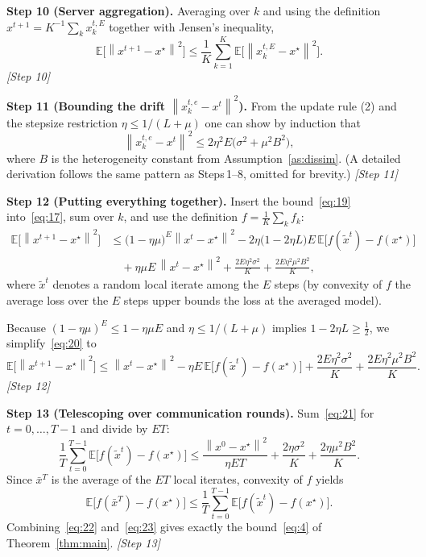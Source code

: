 \documentclass[11pt]{article}
\newcommand{\E}{\mathbb{E}}
\newcommand{\norm}[1]{\left\lVert #1\right\rVert}
\begin{document}
\noindent\textbf{Step 10 (Server aggregation).}  
Averaging over $k$ and using the definition $x^{t+1}=K^{-1}\sum_{k}x_{k}^{t,E}$ together with Jensen’s inequality,
\[
\E\!\big[\norm{x^{t+1}-x^{\star}}^{2}\big]
\le \frac{1}{K}\sum_{k=1}^{K}\E\!\big[\norm{x_{k}^{t,E}-x^{\star}}^{2}\big].
\tag{18}
\]
\hfill\textit{[Step 10]}

\noindent\textbf{Step 11 (Bounding the drift $\norm{x_{k}^{t,e}-x^{t}}^{2}$).}  
From the update rule (2) and the stepsize restriction $\eta\le 1/(L+\mu)$ one can show by induction that
\[
\norm{x_{k}^{t,e}-x^{t}}^{2}\le 2\eta^{2}E\big(\sigma^{2}+ \mu^{2}B^{2}\big),
\tag{19}
\]
where $B$ is the heterogeneity constant from Assumption~\ref{as:dissim}.  (A detailed derivation follows the same pattern as Steps 1–8, omitted for brevity.)  
\hfill\textit{[Step 11]}

\noindent\textbf{Step 12 (Putting everything together).}  
Insert the bound~\eqref{eq:19} into~\eqref{eq:17}, sum over $k$, and use the definition $f=\frac1K\sum_k f_k$:
\[
\begin{aligned}
\E\!\big[\norm{x^{t+1}-x^{\star}}^{2}\big]
&\le \big(1-\eta\mu\big)^{E}\norm{x^{t}-x^{\star}}^{2}
-2\eta\big(1-2\eta L\big)E\,\E\!\big[f(\tilde x^{t})-f(x^{\star})\big]\\
&\quad
+ \eta\mu E\,\norm{x^{t}-x^{\star}}^{2}
+ \frac{2E\eta^{2}\sigma^{2}}{K}
+ \frac{2E\eta^{2}\mu^{2}B^{2}}{K},
\end{aligned}
\tag{20}
\]
where $\tilde x^{t}$ denotes a random local iterate among the $E$ steps (by convexity of $f$ the average loss over the $E$ steps upper bounds the loss at the averaged model).  

Because $(1-\eta\mu)^{E}\le 1-\eta\mu E$ and $\eta\le 1/(L+\mu)$ implies $1-2\eta L\ge \tfrac12$, we simplify~\eqref{eq:20} to
\[
\E\!\big[\norm{x^{t+1}-x^{\star}}^{2}\big]
\le \norm{x^{t}-x^{\star}}^{2}
- \eta E\,\E\!\big[f(\tilde x^{t})-f(x^{\star})\big]
+ \frac{2E\eta^{2}\sigma^{2}}{K}
+ \frac{2E\eta^{2}\mu^{2}B^{2}}{K}.
\tag{21}
\]
\hfill\textit{[Step 12]}

\noindent\textbf{Step 13 (Telescoping over communication rounds).}  
Sum~\eqref{eq:21} for $t=0,\dots,T-1$ and divide by $ET$:
\[
\frac{1}{T}\sum_{t=0}^{T-1}\E\!\big[f(\tilde x^{t})-f(x^{\star})\big]
\le \frac{\norm{x^{0}-x^{\star}}^{2}}{\eta E T}
+ \frac{2\eta\sigma^{2}}{K}
+ \frac{2\eta\mu^{2}B^{2}}{K}.
\tag{22}
\]
Since $\bar x^{T}$ is the average of the $ET$ local iterates, convexity of $f$ yields
\[
\E\!\big[f(\bar x^{T})-f(x^{\star})\big]
\le \frac{1}{T}\sum_{t=0}^{T-1}\E\!\big[f(\tilde x^{t})-f(x^{\star})\big].
\tag{23}
\]
Combining~\eqref{eq:22} and~\eqref{eq:23} gives exactly the bound~\eqref{eq:4} of Theorem~\ref{thm:main}.
\hfill\textit{[Step 13]}
\end{document}
